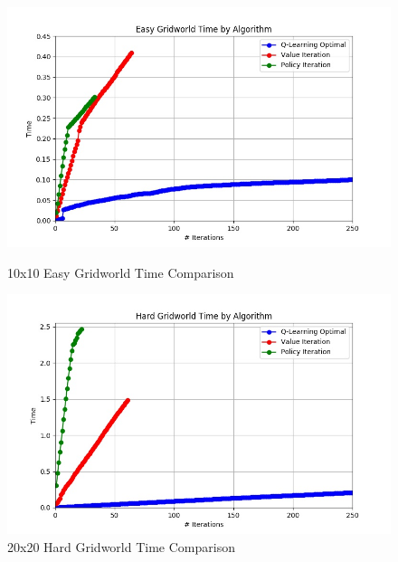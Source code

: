 \documentclass[h]{article}
\begin{document}
  \begin{figure}[H]
   \endminipage\hfill
      \includegraphics[width=1\textwidth,keepaspectratio]{easy_time.jpg} 
      \caption*{10x10 Easy Gridworld Time Comparison} 
   \endminipage\hfill
      \includegraphics[width=1\textwidth,keepaspectratio]{hard_time.jpg} 
      \caption*{20x20 Hard Gridworld Time Comparison} 
   \endminipage\hfill
   \endminipage\hfill
\end{figure}
\end{document}
